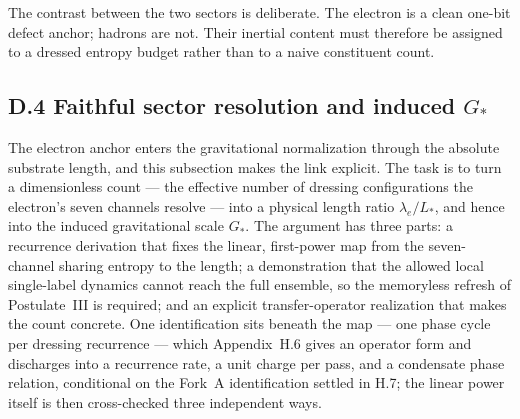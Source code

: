 \documentclass[11pt]{article}
\begin{document}
The contrast between the two sectors is deliberate. The electron is a clean one-bit defect anchor; hadrons are not. Their inertial content must therefore be assigned to a dressed entropy budget rather than to a naive constituent count.

\subsection*{D.4 Faithful sector resolution and induced \texorpdfstring{$G_*$}{G*}}

The electron anchor enters the gravitational normalization through the absolute substrate length, and this subsection makes the link explicit. The task is to turn a dimensionless count --- the effective number of dressing configurations the electron's seven channels resolve --- into a physical length ratio $\lambda_e/L_*$, and hence into the induced gravitational scale $G_*$. The argument has three parts: a recurrence derivation that fixes the linear, first-power map from the seven-channel sharing entropy to the length; a demonstration that the allowed local single-label dynamics cannot reach the full ensemble, so the memoryless refresh of Postulate~III is required; and an explicit transfer-operator realization that makes the count concrete. One identification sits beneath the map --- one phase cycle per dressing recurrence --- which Appendix~H.6 gives an operator form and discharges into a recurrence rate, a unit charge per pass, and a condensate phase relation, conditional on the Fork~A identification settled in H.7; the linear power itself is then cross-checked three independent ways.
\end{document}
